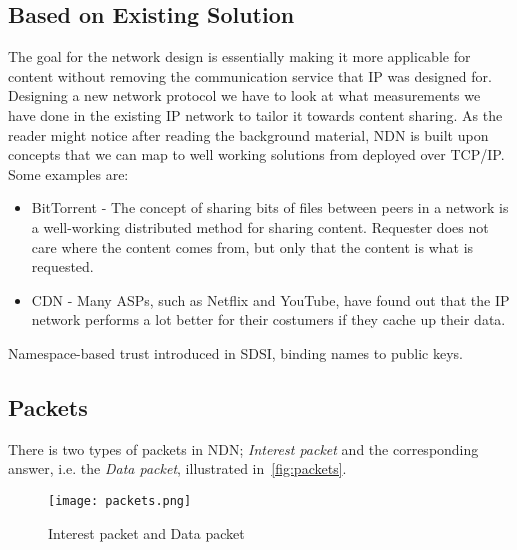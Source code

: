 \subsection{Based on Existing Solution}
The goal for the network design is essentially making it more applicable for content without removing the communication service that \gls{IP} was designed for. 
Designing a new network protocol we have to look at what measurements we have done in the existing \gls{IP} network to tailor it towards content sharing.
As the reader might notice after reading the background material, \gls{NDN} is built upon concepts that we can map to well working solutions from deployed over \gls{TCP}/\gls{IP}.
Some examples are:
\begin{itemize}
  \item BitTorrent - 
  The concept of sharing bits of files between peers in a network is a well-working distributed method for sharing content. 
  Requester does not care where the content comes from, but only that the content is what is requested.
  \item \gls{CDN} - 
  Many \gls{ASP}s, such as Netflix and YouTube, have found out that the \gls{IP} network performs a lot better for their costumers if they cache up their data.
\end{itemize}

Namespace-based trust introduced in \gls{SDSI}, binding names to public keys. 

\subsection{Packets}\label{packets}
There is two types of packets in \gls{NDN};
\textit{Interest packet} and the corresponding answer, i.e. the \textit{Data packet}, illustrated in~\autoref{fig:packets}.

\begin{figure}[H]
  \centering
  \texttt{[image: packets.png]}
  \caption{Interest packet and Data packet}
  \label{fig:packets}
\end{figure}

